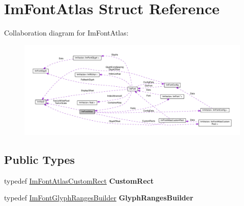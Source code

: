 \hypertarget{structImFontAtlas}{}\section{Im\+Font\+Atlas Struct Reference}
\label{structImFontAtlas}


Collaboration diagram for Im\+Font\+Atlas\+:\nopagebreak
\begin{figure}[H]
\begin{center}
\leavevmode
\includegraphics[width=350pt]{structImFontAtlas__coll__graph}
\end{center}
\end{figure}
\subsection*{Public Types}
\begin{DoxyCompactItemize}
\item 
\mbox{\label{structImFontAtlas_a4d762c14ffdcc37cc68f8ff3e4926f4b}} 
typedef \hyperlink{structImFontAtlasCustomRect}{Im\+Font\+Atlas\+Custom\+Rect} {\bfseries Custom\+Rect}
\item 
\mbox{\label{structImFontAtlas_aa9b2fa0610903d5da7d9dfbfad3393af}} 
typedef \hyperlink{structImFontGlyphRangesBuilder}{Im\+Font\+Glyph\+Ranges\+Builder} {\bfseries Glyph\+Ranges\+Builder}
\end{DoxyCompactItemize}
